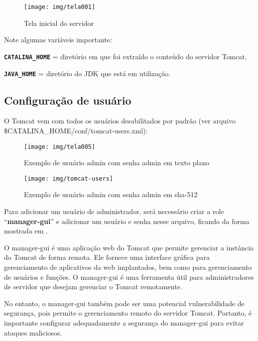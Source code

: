 \begin{figure}[H]
	\centering
	\caption[Tela inicial]{Tela inicial do servidor}
	\texttt{[image: img/tela001]}
	\label{fig:tomcat-telainicial}
\end{figure}


Note algumas variáveis importante:

\texttt{\textbf{CATALINA\_HOME}} = diretório em que foi extraído o conteúdo do servidor Tomcat.

\texttt{\textbf{JAVA\_HOME}} = diretório do JDK que está em utilização.

\subsection{Configuração de usuário}

O Tomcat vem com todos os usuários desabilitados por padrão (ver arquivo\\ \$CATALINA\_HOME/conf/tomcat-users.xml):

\begin{figure}[H]
	\centering
	\caption[tomcat-users.xml]{Exemplo de usuário admin com senha admin em texto plano}
	\texttt{[image: img/tela005]}
	\label{fig:tomcat-users-texto-plano}
\end{figure}

\begin{figure}[H]
	\centering
	\caption[tomcat-users.xml]{Exemplo de usuário admin com senha admin em sha-512}
	\texttt{[image: img/tomcat-users]}
	\label{fig:tomcat-users}
\end{figure}


Para adicionar um usuário de administrador, será necessário criar a role “\textbf{manager-gui}” e adicionar um usuário e senha nesse arquivo, ficando da forma mostrada em .

O manager-gui é uma aplicação web do Tomcat que permite gerenciar a instância do Tomcat de forma remota. Ele fornece uma interface gráfica para gerenciamento de aplicativos da web implantados, bem como para gerenciamento de usuários e funções. O manager-gui é uma ferramenta útil para administradores de servidor que desejam gerenciar o Tomcat remotamente.

No entanto, o manager-gui também pode ser uma potencial vulnerabilidade de segurança, pois permite o gerenciamento remoto do servidor Tomcat. Portanto, é importante configurar adequadamente a segurança do manager-gui para evitar ataques maliciosos.

